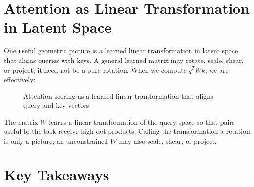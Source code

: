 \documentclass{article}
\begin{document}
\section{Attention as Linear Transformation in Latent Space}

One useful geometric picture is a learned linear transformation in latent space that
aligns queries with keys. A general learned matrix may rotate, scale, shear, or project;
it need not be a pure rotation. When we compute $q^T W k$, we are effectively:

\begin{figure}[h]
\centering
{}
\caption{Attention scoring as a learned linear transformation that aligns query and key vectors}
\end{figure}

The matrix $W$ learns a linear transformation of the query space so that pairs useful
to the task receive high dot products. Calling the transformation a rotation is only
a picture; an unconstrained $W$ may also scale, shear, or project.




\section{Key Takeaways}
\end{document}

